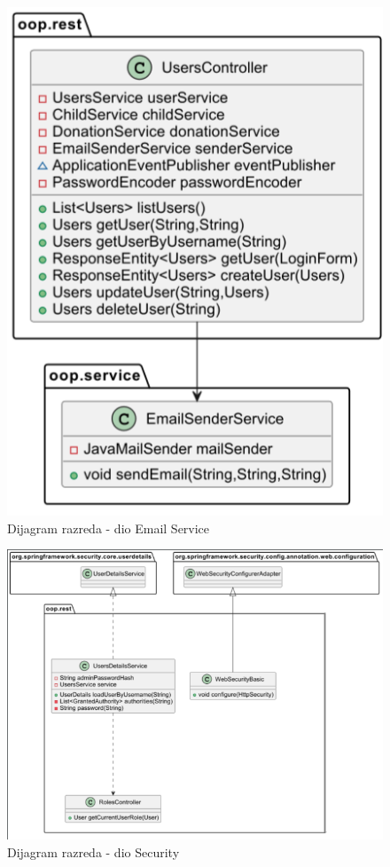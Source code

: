                 \begin{figure}[H]
				\includegraphics[width=\textwidth,height=0.4\textheight]{dijagrami/EmailService.png}
				\centering
				\caption{Dijagram razreda - dio Email Service}
				\label{fig:EmailService}
			\end{figure}

                \begin{figure}[H]
				\includegraphics[width=\textwidth,height=0.4\textheight]{dijagrami/Security.png}
				\centering
				\caption{Dijagram razreda - dio Security}
				\label{fig:Security}
			\end{figure}
   
